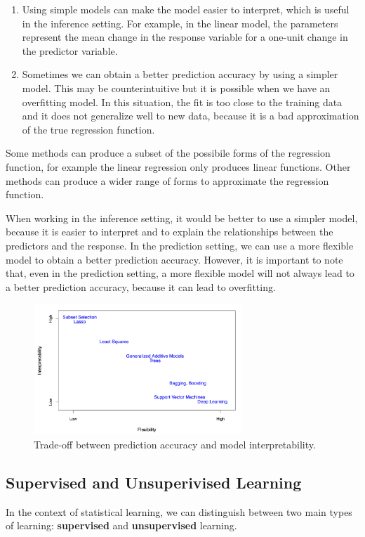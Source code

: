 \begin{enumerate}
    \item Using simple models can make the model easier to interpret, which is useful in the inference setting. For example, in the linear model, the parameters represent the mean change in the response variable for a one-unit change in the predictor variable.
    \item Sometimes we can obtain a better prediction accuracy by using a simpler model. This may be counterintuitive but it is possible when we have an overfitting model. In this situation, the fit is too close to the training data and it does not generalize well to new data, because it is a bad approximation of the true regression function.
\end{enumerate}

Some methods can produce a subset of the possibile forms of the regression function, for example the linear regression only produces linear functions. Other methods can produce a wider range of forms to approximate the regression function.

When working in the inference setting, it would be better to use a simpler model, because it is easier to interpret and to explain the relationships between the predictors and the response. In the prediction setting, we can use a more flexible model to obtain a better prediction accuracy. However, it is important to note that, even in the prediction setting, a more flexible model will not always lead to a better prediction accuracy, because it can lead to overfitting.

\begin{figure}[H]
    \centering
    \includegraphics[width=0.7\textwidth]{./figures/intro/flexintertradeoff.png}
    \caption{Trade-off between prediction accuracy and model interpretability.}
    \label{fig:flexintertradeoff}
\end{figure}

\subsection*{Supervised and Unsuperivised Learning}
In the context of statistical learning, we can distinguish between two main types of learning: \textbf{supervised} and \textbf{unsupervised} learning.

